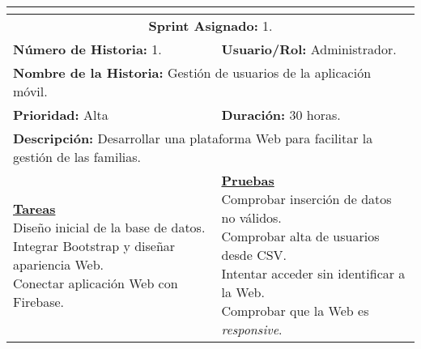 \resizebox{15cm}{!} {
	\begin{tabular}{|l|l|}
		\hline
		\multicolumn{2}{|c|}{\cellcolor[HTML]{343434}{\color[HTML]{FFFFFF} \textbf{Historia de Usuario}}} \\
		\hline
		\multicolumn{2}{|c|}{\textbf{Sprint Asignado:} 1.} \\
		\hline
		\textbf{Número de Historia:} 1. & \textbf{Usuario/Rol:} Administrador.\\
		\hline
		\multicolumn{2}{|l|}{\textbf{Nombre de la Historia:} Gestión de usuarios de la aplicación móvil.} \\
		\hline
		\textbf{Prioridad:} Alta & \textbf{Duración:} 30 horas.\\
		\hline
		\multicolumn{2}{|l|}{\textbf{Descripción:} Desarrollar una plataforma Web para facilitar la gestión de las familias.} \\
		\hline
		\specialcell{\underline{\textbf{Tareas}} \\ Diseño inicial de la base de datos. \\ Integrar Bootstrap y diseñar apariencia Web. \\ Conectar aplicación Web con Firebase.} & \specialcell{\underline{\textbf{Pruebas}} \\ Comprobar inserción de datos no válidos. \\ Comprobar alta de usuarios desde \acs{CSV}. \\ Intentar acceder sin identificar a la Web. \\ Comprobar que la Web es \textit{responsive}.} \\
		\hline
	\end{tabular}
}
